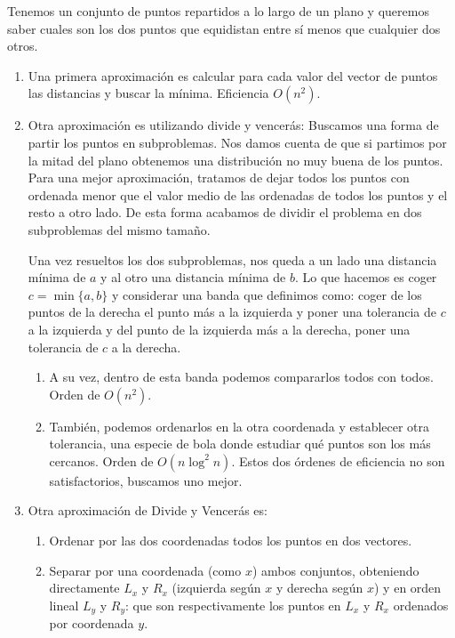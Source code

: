 \begin{ejercicio*}
    Tenemos un conjunto de puntos repartidos a lo largo de un plano y queremos saber cuales son los dos puntos que equidistan entre sí menos que cualquier dos otros.

    \begin{enumerate}
        \item Una primera aproximación es calcular para cada valor del vector de puntos las distancias y buscar la mínima. Eficiencia $O(n^2)$.
        \item Otra aproximación es utilizando divide y vencerás: Buscamos una forma de partir los puntos en subproblemas. Nos damos cuenta de que si partimos por la mitad del plano obtenemos una distribución no muy buena de los puntos. Para una mejor aproximación, tratamos de dejar todos los puntos con ordenada menor que el valor medio de las ordenadas de todos los puntos y el resto a otro lado. De esta forma acabamos de dividir el problema en dos subproblemas del mismo tamaño. 

            Una vez resueltos los dos subproblemas, nos queda a un lado una distancia mínima de $a$ y al otro una distancia mínima de $b$. Lo que hacemos es coger $c = \min\{a, b\}$ y considerar una banda que definimos como: coger de los puntos de la derecha el punto más a la izquierda y poner una tolerancia de $c$ a la izquierda y del punto de la izquierda más a la derecha, poner una tolerancia de $c$ a la derecha.

        \begin{enumerate}
            \item A su vez, dentro de esta banda podemos compararlos todos con todos. Orden de $O(n^2)$.
            \item También, podemos ordenarlos en la otra coordenada y establecer otra tolerancia, una especie de bola donde estudiar qué puntos son los más cercanos. Orden de $O(n\log^2 n)$.
                Estos dos órdenes de eficiencia no son satisfactorios, buscamos uno mejor.
        \end{enumerate}
        \item Otra aproximación de Divide y Vencerás es:
            \begin{enumerate}
                \item Ordenar por las dos coordenadas todos los puntos en dos vectores. 
                \item Separar por una coordenada (como $x$) ambos conjuntos, obteniendo directamente $L_x$ y $R_x$ (izquierda según $x$ y derecha según $x$) y en orden lineal $L_y$ y $R_y$: que son respectivamente los puntos en $L_x$ y $R_x$ ordenados por coordenada $y$.
            \end{enumerate}
        \end{enumerate}
\end{ejercicio*}
